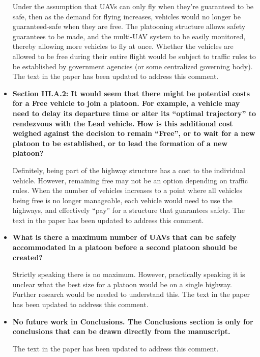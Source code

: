 \documentclass[submit]{aiaa-pretty}
\begin{document}
\begin{itemize}
Under the assumption that UAVs can only fly when they're guaranteed to be safe, then as the demand for flying increases, vehicles would no longer be guaranteed-safe when they are free. The platooning structure allows safety guarantees to be made, and the multi-UAV system to be easily monitored, thereby allowing more vehicles to fly at once. Whether the vehicles are allowed to be free during their entire flight would be subject to traffic rules to be established by government agencies (or some centralized governing body). The text in the paper has been updated to address this comment.

\item\textbf{Section III.A.2: It would seem that there might be potential costs for a Free vehicle to join a platoon.  For example, a vehicle may need to delay its departure time or alter its “optimal trajectory” to rendezvous with the Lead vehicle.  How is this additional cost weighed against the decision to remain “Free”, or to wait for a new platoon to be established, or to lead the formation of a new platoon?}

Definitely, being part of the highway structure has a cost to the individual vehicle. However, remaining free may not be an option depending on traffic rules. When the number of vehicles increases to a point where all vehicles being free is no longer manageable, each vehicle would need to use the highways, and effectively ``pay'' for a structure that guarantees safety. The text in the paper has been updated to address this comment.

\item\textbf{What is there a maximum number of UAVs that can be safely accommodated in a platoon before a second platoon should be created?}

Strictly speaking there is no maximum. However, practically speaking it is unclear what the best size for a platoon would be on a single highway. Further research would be needed to understand this. The text in the paper has been updated to address this comment.

\item\textbf{No future work in Conclusions.  The Conclusions section is only for conclusions that can be drawn directly from the manuscript.}

The text in the paper has been updated to address this comment.
\end{itemize}
\end{document}
